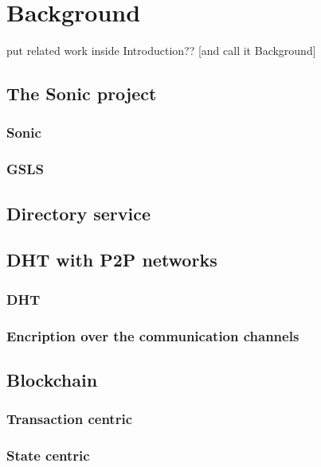 \section{Background}
\label{S:2}

put related work inside Introduction?? [and call it Background]

\subsection{The Sonic project}

\subsubsection{Sonic}
\subsubsection{GSLS}


\subsection{Directory service}



\subsection{DHT with P2P networks}

\subsubsection{DHT}

\subsubsection{Encription over the communication channels}




\subsection{Blockchain}


\subsubsection{Transaction centric}
\subsubsection{State centric}



